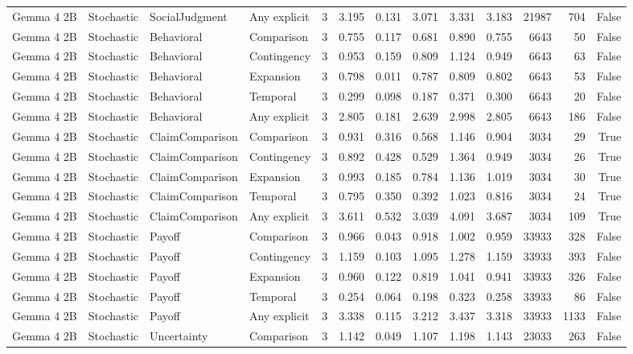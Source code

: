 \begin{tabular}{llllrrrrrrrrr}
Gemma 4 2B & Stochastic & SocialJudgment & Any explicit & 3 & 3.195 & 0.131 & 3.071 & 3.331 & 3.183 & 21987 & 704 & False \\
Gemma 4 2B & Stochastic & Behavioral & Comparison & 3 & 0.755 & 0.117 & 0.681 & 0.890 & 0.755 & 6643 & 50 & False \\
Gemma 4 2B & Stochastic & Behavioral & Contingency & 3 & 0.953 & 0.159 & 0.809 & 1.124 & 0.949 & 6643 & 63 & False \\
Gemma 4 2B & Stochastic & Behavioral & Expansion & 3 & 0.798 & 0.011 & 0.787 & 0.809 & 0.802 & 6643 & 53 & False \\
Gemma 4 2B & Stochastic & Behavioral & Temporal & 3 & 0.299 & 0.098 & 0.187 & 0.371 & 0.300 & 6643 & 20 & False \\
Gemma 4 2B & Stochastic & Behavioral & Any explicit & 3 & 2.805 & 0.181 & 2.639 & 2.998 & 2.805 & 6643 & 186 & False \\
Gemma 4 2B & Stochastic & ClaimComparison & Comparison & 3 & 0.931 & 0.316 & 0.568 & 1.146 & 0.904 & 3034 & 29 & True \\
Gemma 4 2B & Stochastic & ClaimComparison & Contingency & 3 & 0.892 & 0.428 & 0.529 & 1.364 & 0.949 & 3034 & 26 & True \\
Gemma 4 2B & Stochastic & ClaimComparison & Expansion & 3 & 0.993 & 0.185 & 0.784 & 1.136 & 1.019 & 3034 & 30 & True \\
Gemma 4 2B & Stochastic & ClaimComparison & Temporal & 3 & 0.795 & 0.350 & 0.392 & 1.023 & 0.816 & 3034 & 24 & True \\
Gemma 4 2B & Stochastic & ClaimComparison & Any explicit & 3 & 3.611 & 0.532 & 3.039 & 4.091 & 3.687 & 3034 & 109 & True \\
Gemma 4 2B & Stochastic & Payoff & Comparison & 3 & 0.966 & 0.043 & 0.918 & 1.002 & 0.959 & 33933 & 328 & False \\
Gemma 4 2B & Stochastic & Payoff & Contingency & 3 & 1.159 & 0.103 & 1.095 & 1.278 & 1.159 & 33933 & 393 & False \\
Gemma 4 2B & Stochastic & Payoff & Expansion & 3 & 0.960 & 0.122 & 0.819 & 1.041 & 0.941 & 33933 & 326 & False \\
Gemma 4 2B & Stochastic & Payoff & Temporal & 3 & 0.254 & 0.064 & 0.198 & 0.323 & 0.258 & 33933 & 86 & False \\
Gemma 4 2B & Stochastic & Payoff & Any explicit & 3 & 3.338 & 0.115 & 3.212 & 3.437 & 3.318 & 33933 & 1133 & False \\
Gemma 4 2B & Stochastic & Uncertainty & Comparison & 3 & 1.142 & 0.049 & 1.107 & 1.198 & 1.143 & 23033 & 263 & False \\

\end{tabular}
